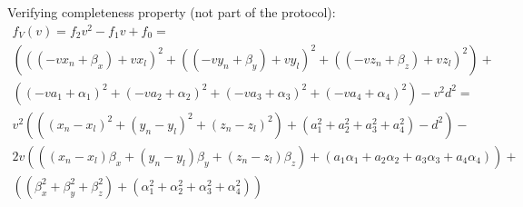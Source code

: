 \documentclass[a4paper,12pt]{article}
\begin{document}
Verifying completeness property (not part of the protocol):
\begin{multline}
  f_V(v) = f_2 v^2 - f_1 v + f_0 = \\
  (((-v x_n + \beta_x) + v x_l)^2 +
   ((-v y_n + \beta_y) + v y_l)^2 +
   ((-v z_n + \beta_z) + v z_l)^2) +  \\
  ((-v a_1 + \alpha_1)^2 +
   (-v a_2 + \alpha_2)^2 +
   (-v a_3 + \alpha_3)^2 +
   (-v a_4 + \alpha_4)^2) - v^2 d^2  = \\
  v^2 (((x_n - x_l)^2 + (y_n - y_l)^2 + (z_n - z_l)^2) + (a_1^2 + a_2^2 + a_3^2 + a_4^2) - d^2) - \\
  2 v (((x_n - x_l) \beta_x + (y_n - y_l) \beta_y + (z_n - z_l) \beta_z) + (a_1 \alpha_1 + a_2 \alpha_2 + a_3 \alpha_3 + a_4 \alpha_4)) + \\
  ((\beta_x^2 + \beta_y^2 + \beta_z^2) + (\alpha_1^2 + \alpha_2^2 + \alpha_3^2 + \alpha_4^2))
\end{multline}
\end{document}
